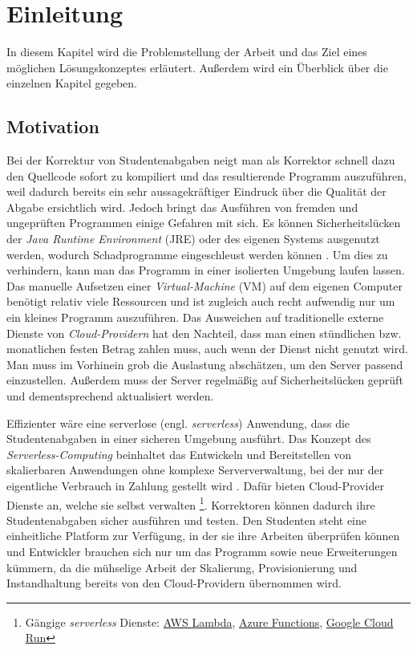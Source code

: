 \chapter{Einleitung}
In diesem Kapitel wird die Problemstellung der Arbeit und das Ziel eines möglichen Lösungskonzeptes
erläutert. Außerdem wird ein Überblick über die einzelnen Kapitel gegeben.

\section{Motivation}
Bei der Korrektur von Studentenabgaben neigt man als Korrektor schnell dazu den Quellcode sofort zu kompiliert und das resultierende Programm auszuführen, weil dadurch bereits ein sehr aussagekräftiger Eindruck über die Qualität der Abgabe ersichtlich wird. Jedoch bringt das Ausführen von fremden und ungeprüften Programmen einige Gefahren mit sich.
Es können Sicherheitslücken der \textit{Java Runtime Environment} (JRE) \cite{Jre}
oder des eigenen Systems ausgenutzt werden, wodurch Schadprogramme eingeschleust
werden können \cite{CveJreVuln}.
Um dies zu verhindern, kann man das Programm in einer isolierten Umgebung laufen lassen.
Das manuelle Aufsetzen einer \textit{Virtual-Machine} (VM) \cite{RedHatVM} auf dem eigenen Computer benötigt relativ
viele Ressourcen und ist zugleich auch recht aufwendig nur um ein kleines Programm auszuführen.
Das Ausweichen auf traditionelle externe Dienste von \textit{Cloud-Providern} hat den Nachteil, dass man einen stündlichen bzw. monatlichen festen Betrag zahlen muss, auch wenn der Dienst nicht genutzt wird. Man muss im Vorhinein grob die Auslastung abschätzen, um den Server passend einzustellen. Außerdem muss der Server regelmäßig auf Sicherheitslücken geprüft und dementsprechend aktualisiert werden.

Effizienter wäre eine serverlose (engl. \textit{serverless}) Anwendung, dass die Studentenabgaben in einer sicheren Umgebung ausführt.
Das Konzept des \textit{Serverless-Computing} beinhaltet das Entwickeln und Bereitstellen
von skalierbaren Anwendungen ohne komplexe Serververwaltung, bei der nur der eigentliche Verbrauch
in Zahlung gestellt wird \cite{CioGov}.
Dafür bieten Cloud-Provider Dienste an, welche sie selbst verwalten \footnote{
  Gängige \textit{serverless} Dienste:
  {\href{https://aws.amazon.com/de/lambda/}{AWS Lambda}},
  {\href{https://azure.microsoft.com/de-de/services/functions/}{Azure Functions}},
  {\href{https://cloud.google.com/run?hl=de}{Google Cloud Run}}
}.
Korrektoren können dadurch ihre Studentenabgaben sicher ausführen und testen.
Den Studenten steht eine einheitliche Platform zur Verfügung, in der sie ihre Arbeiten überprüfen können und
Entwickler brauchen sich nur um das Programm sowie neue Erweiterungen kümmern, da die mühselige Arbeit
der Skalierung, Provisionierung und Instandhaltung bereits von den Cloud-Providern übernommen wird.

